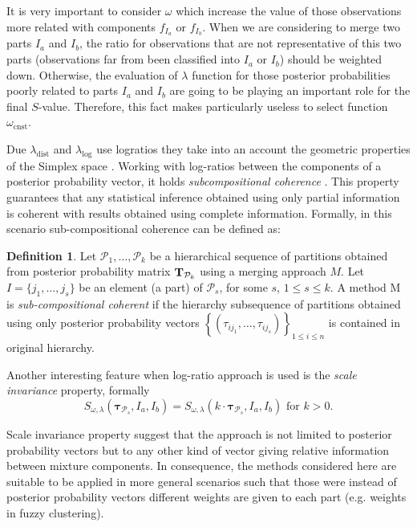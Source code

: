 \documentclass[submit]{smj}
\theoremstyle{definition}
\newtheorem{defn}{Definition}[section]
\newcommand{\m}[1]{\boldsymbol{#1}}
\begin{document}
It is very important to consider $\omega$ which increase the value of those observations more related with components $f_{I_a}$ or $f_{I_b}$. When we are considering to merge two parts $I_a$ and $I_b$, the ratio for observations that are not representative of this two parts (observations far from been classified into $I_a$ or $I_b$) should be weighted down. Otherwise, the evaluation of $\lambda$ function for those posterior probabilities poorly related to parts $I_a$ and $I_b$ are going to be playing an important role for the final $S$-value. Therefore, this fact makes particularly useless to select function $\omega_{\text{cnst}}$.


Due $\lambda_{\text{dist}}$ and $\lambda_{\log}$ use logratios they take into an account the geometric properties of the Simplex space \citep{aitchison2002simplicial}.  Working with log-ratios between the components of a posterior probability vector, it holds \emph{subcompositional coherence}  \citep{aitchison1986statistical}. This property guarantees that any statistical inference obtained using only partial information is coherent with results obtained using complete information. Formally, in this scenario sub-compositional coherence can be defined as:

\begin{defn}
Let $\mathcal{P}_1, \dots, \mathcal{P}_k$ be a hierarchical sequence of partitions obtained from posterior probability matrix $\text{\textbf{T}}_{\mathcal{P}_k}$ using a merging approach $M$. Let $I = \{j_1, \dots, j_s\}$ be an element (a part) of $\mathcal{P}_s$, for some $s$, $1\leq s \leq k$. A method M is \emph{sub-compositional coherent} if the hierarchy subsequence of partitions obtained  using only posterior probability vectors $\left\{ \left(\tau_{ij_1}, \dots, \tau_{ij_s} \right)\right\}_{1\leq i \leq n}$ is contained in original hierarchy.
\end{defn}

Another interesting feature when log-ratio approach is used is the \emph{scale invariance} property, formally
\[
S_{\omega, \lambda}( \m\tau_{\mathcal{P}_s},  I_a,  I_b) = S_{\omega, \lambda}(k\cdot \m\tau_{\mathcal{P}_s},  I_a,  I_b) \text{ for $k>0$.}
\] 

Scale invariance property suggest that the approach is not limited to posterior probability vectors but to any other kind of vector giving relative information between mixture components. In consequence, the methods considered here are suitable to be applied in more general scenarios such that those were instead of posterior probability vectors different weights are given to each part (e.g. weights in fuzzy clustering).
\end{document}
